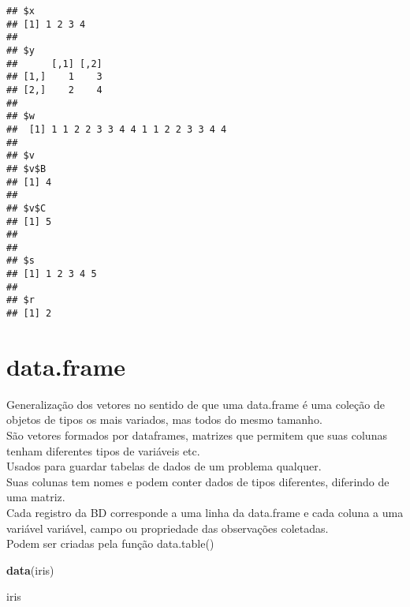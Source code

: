 \documentclass[]{article}
\newenvironment{Shaded}{\begin{snugshade}}{\end{snugshade}}
\newcommand{\KeywordTok}[1]{\textcolor[rgb]{0.13,0.29,0.53}{\textbf{#1}}}
\newcommand{\NormalTok}[1]{#1}
\begin{document}
\begin{verbatim}
## $x
## [1] 1 2 3 4
## 
## $y
##      [,1] [,2]
## [1,]    1    3
## [2,]    2    4
## 
## $w
##  [1] 1 1 2 2 3 3 4 4 1 1 2 2 3 3 4 4
## 
## $v
## $v$B
## [1] 4
## 
## $v$C
## [1] 5
## 
## 
## $s
## [1] 1 2 3 4 5
## 
## $r
## [1] 2
\end{verbatim}

\section{data.frame}\label{data.frame}

Generalização dos vetores no sentido de que uma data.frame é uma coleção
de objetos de tipos os mais variados, mas todos do mesmo tamanho.\\
São vetores formados por dataframes, matrizes que permitem que suas
colunas tenham diferentes tipos de variáveis etc.\\
Usados para guardar tabelas de dados de um problema qualquer.\\
Suas colunas tem nomes e podem conter dados de tipos diferentes,
diferindo de uma matriz.\\
Cada registro da BD corresponde a uma linha da data.frame e cada coluna
a uma variável variável, campo ou propriedade das observações
coletadas.\\
Podem ser criadas pela função data.table()

\begin{Shaded}
\begin{Highlighting}[]
\KeywordTok{data}\NormalTok{(iris)}

\NormalTok{iris}
\end{Highlighting}
\end{Shaded}
\end{document}
